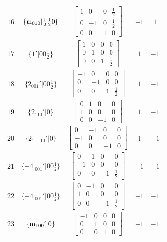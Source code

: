 \documentclass[fleqn,8pt]{jsarticle}
\begin{document}
\begin{longtable}{ccccc}
$ 16 $ & $ \{{\rm m}_{010}|\frac{1}{2} \frac{1}{2} 0\} $ & $ \begin{bmatrix} 1 & 0 & 0 & \frac{1}{2} \\ 0 & -1 & 0 & \frac{1}{2} \\ 0 & 0 & 1 & 0 \end{bmatrix} $ & $ -1 $ & $ 1 $ \\ \hline
$ 17 $ & $ \{1{}'|0 0 \frac{1}{2}\} $ & $ \begin{bmatrix} 1 & 0 & 0 & 0 \\ 0 & 1 & 0 & 0 \\ 0 & 0 & 1 & \frac{1}{2} \end{bmatrix} $ & $ 1 $ & $ -1 $ \\ \hline
$ 18 $ & $ \{2{}_{001}{}'|0 0 \frac{1}{2}\} $ & $ \begin{bmatrix} -1 & 0 & 0 & 0 \\ 0 & -1 & 0 & 0 \\ 0 & 0 & 1 & \frac{1}{2} \end{bmatrix} $ & $ 1 $ & $ -1 $ \\ \hline
$ 19 $ & $ \{2{}_{110}{}'|0\} $ & $ \begin{bmatrix} 0 & 1 & 0 & 0 \\ 1 & 0 & 0 & 0 \\ 0 & 0 & -1 & 0 \end{bmatrix} $ & $ 1 $ & $ -1 $ \\ \hline
$ 20 $ & $ \{2{}_{1-10}{}'|0\} $ & $ \begin{bmatrix} 0 & -1 & 0 & 0 \\ -1 & 0 & 0 & 0 \\ 0 & 0 & -1 & 0 \end{bmatrix} $ & $ 1 $ & $ -1 $ \\ \hline
$ 21 $ & $ \{-4^{+}_{\,\,001}{}'|0 0 \frac{1}{2}\} $ & $ \begin{bmatrix} 0 & 1 & 0 & 0 \\ -1 & 0 & 0 & 0 \\ 0 & 0 & -1 & \frac{1}{2} \end{bmatrix} $ & $ -1 $ & $ -1 $ \\ \hline
$ 22 $ & $ \{-4^{-}_{\,\,001}{}'|0 0 \frac{1}{2}\} $ & $ \begin{bmatrix} 0 & -1 & 0 & 0 \\ 1 & 0 & 0 & 0 \\ 0 & 0 & -1 & \frac{1}{2} \end{bmatrix} $ & $ -1 $ & $ -1 $ \\ \hline
$ 23 $ & $ \{{\rm m}_{100}{}'|0\} $ & $ \begin{bmatrix} -1 & 0 & 0 & 0 \\ 0 & 1 & 0 & 0 \\ 0 & 0 & 1 & 0 \end{bmatrix} $ & $ -1 $ & $ -1 $ \\ \hline

\end{longtable}
\end{document}
